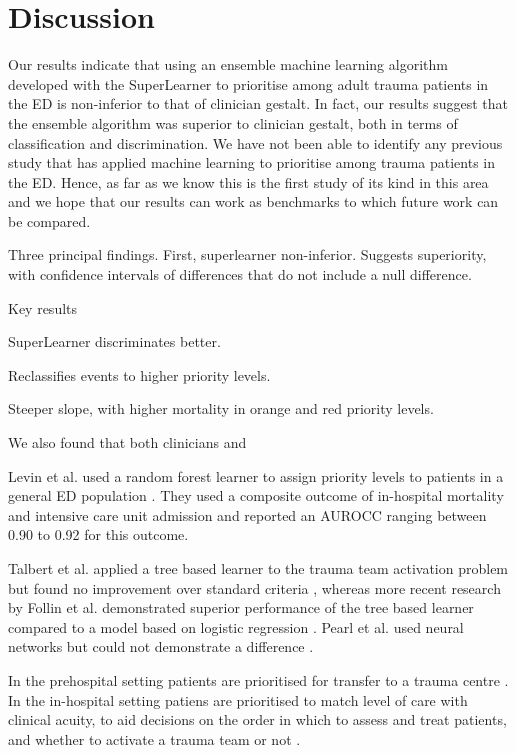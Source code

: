\documentclass[10pt,letterpaper]{article}\usepackage[]{graphicx}\usepackage[]{color}
\begin{document}
\section*{Discussion}
Our results indicate that using an ensemble machine learning algorithm developed
with the SuperLearner to prioritise among adult trauma patients in the ED is
non-inferior to that of clinician gestalt. In fact, our results suggest that the
ensemble algorithm was superior to clinician gestalt, both in terms of
classification and discrimination. We have not been able to identify any
previous study that has applied machine learning to prioritise among trauma
patients in the ED. Hence, as far as we know this is the first study of its kind
in this area and we hope that our results can work as benchmarks to which future
work can be compared.

Three principal findings. First, superlearner non-inferior. Suggests
superiority, with confidence intervals of differences that do not include a null
difference.

Key results

SuperLearner discriminates better.

Reclassifies events to higher priority levels.

Steeper slope, with higher mortality in orange and red priority levels.

We also found that both clinicians and 

Levin et al. used a random forest learner to assign priority levels to patients
in a general ED population \cite{Levin2018}. They used a composite outcome of
in-hospital mortality and intensive care unit admission and reported an AUROCC
ranging between 0.90 to 0.92 for this outcome. 

Talbert et al. applied a tree based learner to the trauma team activation
problem but found no improvement over standard criteria \cite{Talbert2007},
whereas more recent research by Follin et al. demonstrated superior performance
of the tree based learner compared to a model based on logistic regression
\cite{Follin2016}. Pearl et al. used neural networks but could not demonstrate a
difference \cite{Pearl2008}.

In the prehospital setting patients are prioritised for transfer to a trauma
centre \cite{Voskens2018}. In the in-hospital setting patiens are prioritised to
match level of care with clinical acuity, to aid decisions on the order in which
to assess and treat patients, and whether to activate a trauma team or not
\cite{Granstrom2018}.
\end{document}
